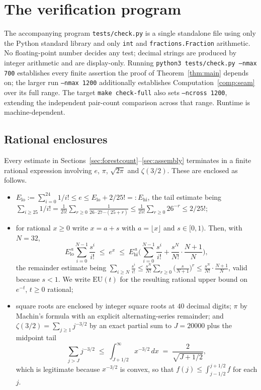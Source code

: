 \documentclass[11pt,a4paper]{amsart}
\theoremstyle{plain}
\theoremstyle{definition}
\begin{document}
\appendix

\section{The verification program}\label{app:cert}

The accompanying program \texttt{tests/check.py} is a single standalone file
using only the Python standard library and only \texttt{int} and
\texttt{fractions.Fraction} arithmetic. No floating-point number decides any
test; decimal strings are produced by integer arithmetic and are display-only. Running
\texttt{python3 tests/check.py --nmax 700} establishes every finite assertion the
proof of Theorem~\ref{thm:main} depends on; the larger run
\texttt{--nmax 1200} additionally establishes Computation~\ref{comp:seam} over
its full range. The target \texttt{make check-full} also sets
\texttt{--ncross 1200}, extending the independent pair-count comparison across
that range. Runtime is machine-dependent.

\subsection{Rational enclosures}\label{app:rational}

Every estimate in Sections~\ref{sec:forestcount}--\ref{sec:assembly} terminates
in a finite rational expression involving $e$, $\pi$, $\sqrt{2\pi}$ and
$\zeta(3/2)$. These are enclosed as follows.

\begin{itemize}
\item $E_{\mathrm{lo}} := \sum_{i=0}^{24} 1/i! \le e \le
      E_{\mathrm{lo}} + 2/25! =: E_{\mathrm{hi}}$, the tail estimate being
      $\sum_{i \ge 25} 1/i!
       = \frac{1}{25!}\sum_{r\ge0}\frac{1}{26\cdot27\cdots(25+r)}
       \le \frac{1}{25!}\sum_{r\ge0}26^{-r} \le 2/25!$;
\item for rational $x \ge 0$ write $x = a+s$ with $a = \lfloor x \rfloor$ and
      $s \in [0,1)$. Then, with $N = 32$,
      \[
        E_{\mathrm{lo}}^{\,a}\sum_{i=0}^{N-1}\frac{s^i}{i!}
        \;\le\; e^{x} \;\le\;
        E_{\mathrm{hi}}^{\,a}\Big(\sum_{i=0}^{N-1}\frac{s^i}{i!}
          +\frac{s^N}{N!}\cdot\frac{N+1}{N}\Big),
      \]
      the remainder estimate being
      $\sum_{i\ge N}\frac{s^i}{i!}
       \le \frac{s^N}{N!}\sum_{r\ge0}\big(\tfrac{s}{N+1}\big)^{r}
       \le \frac{s^N}{N!}\cdot\frac{N+1}{N}$, valid because $s<1$. We write
      $\mathrm{EU}(t)$ for the resulting rational upper bound on $e^{-t}$,
      $t \ge 0$ rational;
\item square roots are enclosed by integer square roots at $40$ decimal digits;
      $\pi$ by Machin's formula with an explicit alternating-series remainder;
      and $\zeta(3/2)=\sum_{j\ge1}j^{-3/2}$ by an exact partial sum to
      $J = 20000$ plus the midpoint tail
      \[
        \sum_{j>J}j^{-3/2} \;\le\; \int_{J+1/2}^{\infty}x^{-3/2}\,dx
        \;=\; \frac{2}{\sqrt{J+1/2}},
      \]
      which is legitimate because $x^{-3/2}$ is convex, so that
      $f(j)\le\int_{j-1/2}^{j+1/2}f$ for each $j$.
\end{itemize}
\end{document}
